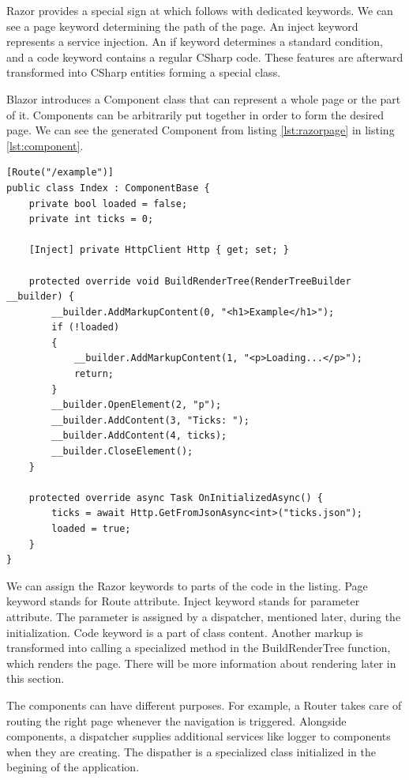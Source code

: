 Razor provides a special sign at which follows with dedicated keywords.
We can see a page keyword determining the path of the page. An inject keyword represents a service injection. An if keyword determines a standard condition, and a code keyword contains a regular CSharp code.
These features are afterward transformed into CSharp entities forming a special class.

Blazor introduces a Component class that can represent a whole page or the part of it.
Components can be arbitrarily put together in order to form the desired page.
We can see the generated Component from listing \ref{lst:razorpage} in listing \ref{lst:component}.

\begin{lstlisting}[basicstyle=\small, caption=Razor page generated to the CSharp class., label={lst:component}]
[Route("/example")]
public class Index : ComponentBase {
	private bool loaded = false;
	private int ticks = 0;
	
	[Inject] private HttpClient Http { get; set; }

	protected override void BuildRenderTree(RenderTreeBuilder __builder) {
		__builder.AddMarkupContent(0, "<h1>Example</h1>");
		if (!loaded)
		{
			__builder.AddMarkupContent(1, "<p>Loading...</p>");
			return;
		}
		__builder.OpenElement(2, "p");
		__builder.AddContent(3, "Ticks: ");
		__builder.AddContent(4, ticks);
		__builder.CloseElement();
	}

	protected override async Task OnInitializedAsync() {
		ticks = await Http.GetFromJsonAsync<int>("ticks.json");
		loaded = true;
	}
}
\end{lstlisting}

We can assign the Razor keywords to parts of the code in the listing.
Page keyword stands for Route attribute.
Inject keyword stands for parameter attribute. The parameter is assigned by a dispatcher, mentioned later, during the initialization.
Code keyword is a part of class content.
Another markup is transformed into calling a specialized method in the BuildRenderTree function, which renders the page. 
There will be more information about rendering later in this section.

The components can have different purposes. For example, a Router takes care of routing the right page whenever the navigation is triggered.
Alongside components, a dispatcher supplies additional services like logger to components when they are creating.
The dispather is a specialized class initialized in the begining of the application.

